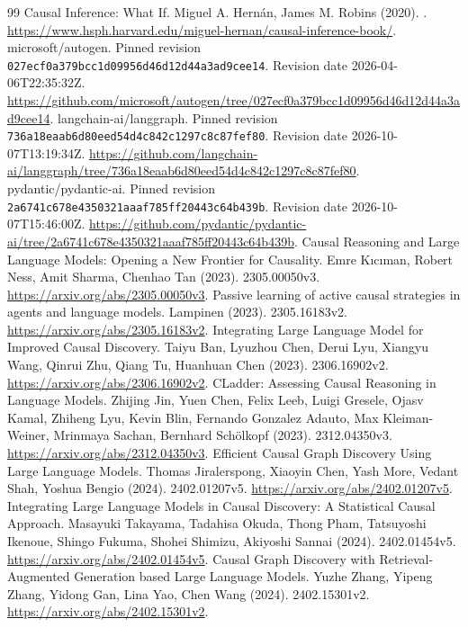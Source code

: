 \begin{thebibliography}{99}
 Causal Inference: What If. Miguel A. Hernán, James M. Robins (2020). . \url{https://www.hsph.harvard.edu/miguel-hernan/causal-inference-book/}.
 microsoft/autogen. Pinned revision \nolinkurl{027ecf0a379bcc1d09956d46d12d44a3ad9cee14}. Revision date 2026-04-06T22:35:32Z. \url{https://github.com/microsoft/autogen/tree/027ecf0a379bcc1d09956d46d12d44a3ad9cee14}.
 langchain-ai/langgraph. Pinned revision \nolinkurl{736a18eaab6d80eed54d4c842c1297c8c87fef80}. Revision date 2026-10-07T13:19:34Z. \url{https://github.com/langchain-ai/langgraph/tree/736a18eaab6d80eed54d4c842c1297c8c87fef80}.
 pydantic/pydantic-ai. Pinned revision \nolinkurl{2a6741c678e4350321aaaf785ff20443c64b439b}. Revision date 2026-10-07T15:46:00Z. \url{https://github.com/pydantic/pydantic-ai/tree/2a6741c678e4350321aaaf785ff20443c64b439b}.
 Causal Reasoning and Large Language Models: Opening a New Frontier for Causality. Emre Kıcıman, Robert Ness, Amit Sharma, Chenhao Tan (2023). 2305.00050v3. \url{https://arxiv.org/abs/2305.00050v3}.
 Passive learning of active causal strategies in agents and language models. Lampinen (2023). 2305.16183v2. \url{https://arxiv.org/abs/2305.16183v2}.
 Integrating Large Language Model for Improved Causal Discovery. Taiyu Ban, Lyuzhou Chen, Derui Lyu, Xiangyu Wang, Qinrui Zhu, Qiang Tu, Huanhuan Chen (2023). 2306.16902v2. \url{https://arxiv.org/abs/2306.16902v2}.
 CLadder: Assessing Causal Reasoning in Language Models. Zhijing Jin, Yuen Chen, Felix Leeb, Luigi Gresele, Ojasv Kamal, Zhiheng Lyu, Kevin Blin, Fernando Gonzalez Adauto, Max Kleiman-Weiner, Mrinmaya Sachan, Bernhard Schölkopf (2023). 2312.04350v3. \url{https://arxiv.org/abs/2312.04350v3}.
 Efficient Causal Graph Discovery Using Large Language Models. Thomas Jiralerspong, Xiaoyin Chen, Yash More, Vedant Shah, Yoshua Bengio (2024). 2402.01207v5. \url{https://arxiv.org/abs/2402.01207v5}.
 Integrating Large Language Models in Causal Discovery: A Statistical Causal Approach. Masayuki Takayama, Tadahisa Okuda, Thong Pham, Tatsuyoshi Ikenoue, Shingo Fukuma, Shohei Shimizu, Akiyoshi Sannai (2024). 2402.01454v5. \url{https://arxiv.org/abs/2402.01454v5}.
 Causal Graph Discovery with Retrieval-Augmented Generation based Large Language Models. Yuzhe Zhang, Yipeng Zhang, Yidong Gan, Lina Yao, Chen Wang (2024). 2402.15301v2. \url{https://arxiv.org/abs/2402.15301v2}.

\end{thebibliography}
